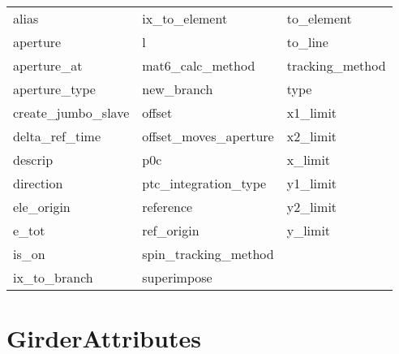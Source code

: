  \begin{tabular}{lll} \toprule
alias                       & ix_to_element               & to_element                  \\
aperture                    & l                           & to_line                     \\
aperture_at                 & mat6_calc_method            & tracking_method             \\
aperture_type               & new_branch                  & type                        \\
create_jumbo_slave          & offset                      & x1_limit                    \\
delta_ref_time              & offset_moves_aperture       & x2_limit                    \\
descrip                     & p0c                         & x_limit                     \\
direction                   & ptc_integration_type        & y1_limit                    \\
ele_origin                  & reference                   & y2_limit                    \\
e_tot                       & ref_origin                  & y_limit                     \\
is_on                       & spin_tracking_method        &                             \\
ix_to_branch                & superimpose                 &                             \\
 \bottomrule
 \end{tabular}
 \vfill
 
 \section{GirderAttributes}
 \label{s:list.girder}
 
